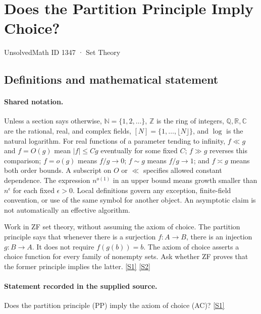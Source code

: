 \documentclass[11pt,a4paper]{article}
\newcommand{\N}{\mathbb{N}}
\newcommand{\Z}{\mathbb{Z}}
\newcommand{\Q}{\mathbb{Q}}
\newcommand{\R}{\mathbb{R}}
\newcommand{\C}{\mathbb{C}}
\newcommand{\sref}[2]{\hyperlink{source:#1:#2}{[S#2]}}
\begin{document}

\setcounter{section}{1346}

\section{Does the Partition Principle Imply Choice?}\label{1347}

{\small\sffamily UnsolvedMath ID 1347 · Set Theory}

\subsection{Definitions and mathematical statement}

\paragraph{Shared notation.}Unless a section says otherwise, $\N=\{1,2,\ldots\}$,
$\Z$ is the ring of integers, $\Q,\R,\C$ are the rational, real, and complex
fields, $[N]=\{1,\ldots,\lfloor N\rfloor\}$, and $\log$ is the natural
logarithm. For real functions of a parameter tending to infinity,
$f\ll g$ and $f=O(g)$ mean $|f|\leq Cg$ eventually for some fixed $C$;
$f\gg g$ reverses this comparison; $f=o(g)$ means $f/g\to0$;
$f\sim g$ means $f/g\to1$; and $f\asymp g$ means both order bounds.
A subscript on $O$ or $\ll$ specifies allowed constant dependence.
The expression $n^{o(1)}$ in an upper bound means growth smaller than
$n^\epsilon$ for each fixed $\epsilon>0$. Local definitions govern any
exception, finite-field convention, or use of the same symbol for another
object. An asymptotic claim is not automatically an effective algorithm.



Work in ZF set theory, without assuming the axiom of choice. The partition principle says that whenever there is a surjection $f:A\to B$, there is an injection $g:B\to A$. It does not require $f(g(b))=b$. The axiom of choice asserts a choice function for every family of nonempty sets. Ask whether ZF proves that the former principle implies the latter. \sref{1347}{1} \sref{1347}{2}

\paragraph{Statement recorded in the supplied source.}
Does the partition principle (PP) imply the axiom of choice (AC)? \sref{1347}{1}
\end{document}
